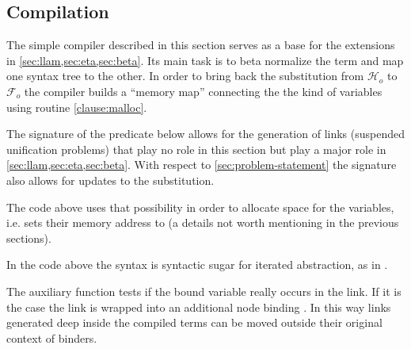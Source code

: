\documentclass[sigconf,natbib=false,review]{acmart}
\newcommand{\llambda}{\ensuremath{\mathcal{L}}\xspace}
\newcommand{\Fo}{\texorpdfstring{\ensuremath{\mathcal{F}_{\!o}\xspace}}{Fo}} %
\newcommand{\Ho}{\texorpdfstring{\ensuremath{\mathcal{H}_o}\xspace}{Ho}}
\begin{document}



\subsection{Compilation}
\label{sec:compilation}

The simple compiler described in this section serves as a base for the
extensions in \cref{sec:llam,sec:eta,sec:beta}.
Its main task is to beta normalize the term and map one syntax tree to
the other.
In order to bring back the substitution from \Ho{} to \Fo{} the compiler
builds a ``memory map'' connecting the the kind of variables using routine
\ref{clause:malloc}.

The signature of the  predicate below allows for the generation of
links (suspended unification problems) that play no role in this section
but play a major role in \cref{sec:llam,sec:eta,sec:beta}.
With respect to \cref{sec:problem-statement} the signature also allows
for updates to the substitution.




\noindent
The code above uses that possibility
in order to allocate space for the variables, i.e. sets their memory
address to  (a details not worth mentioning in the
previous sections).



\noindent
In the code above the syntax  is syntactic sugar for
iterated  abstraction, as in .

The auxiliary function  tests if the bound variable
 really occurs in the link. If it is the case the link is wrapped into
an additional  node binding . In this way links generated
deep inside the compiled terms can be moved outside their original context
of binders.
\end{document}
